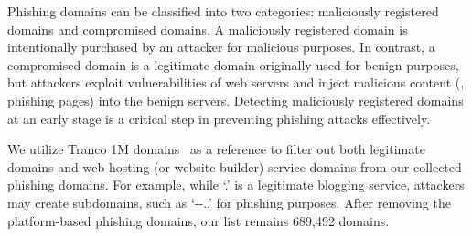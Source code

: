 Phishing domains can be classified into two categories: maliciously registered domains and compromised domains. 
A maliciously registered domain is intentionally purchased by an attacker for malicious purposes.
In contrast, a compromised domain is a legitimate domain originally used for benign purposes, but attackers exploit vulnerabilities of web servers and inject malicious content (\eg, phishing pages) into the benign servers. 
Detecting maliciously registered domains at an early stage is a critical step in preventing phishing attacks effectively.


We utilize Tranco 1M domains~\cite{Aresearc32:online} as a reference to filter out both legitimate domains and web hosting (or website builder) service domains from our collected phishing domains.
For example, while `.' is a legitimate blogging service, attackers may create subdomains, such as `--..' for phishing purposes. 
After removing the platform-based phishing domains, our list remains 689,492 domains. 



